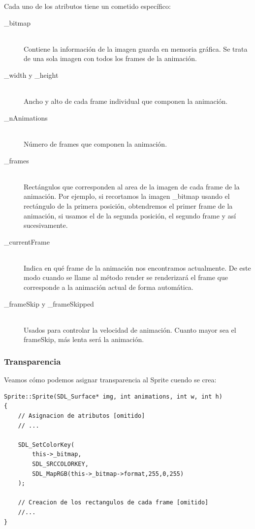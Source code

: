 \documentclass[parskip=half*]{scrartcl}
\begin{document}
		Cada uno de los atributos tiene un cometido espec\'ifico:

		\begin{description}
			\item[\_bitmap] \hfill \\	Contiene la informaci\'on de la imagen guarda en memoria gr\'afica. Se trata de una sola imagen con todos los frames de la animaci\'on.

			\item[\_width y \_height] \hfill \\	Ancho y alto de cada frame individual que componen la animaci\'on.

			\item[\_nAnimations] \hfill \\	N\'umero de frames que componen la animaci\'on.

			\item[\_frames] \hfill \\	Rect\'angulos que corresponden al area de la imagen de cada frame de la animaci\'on. Por ejemplo, si recortamos la imagen \_bitmap usando el rect\'angulo de la primera posici\'on, obtendremos el primer frame de la animaci\'on, si usamos el de la segunda posici\'on, el segundo frame y as\'i sucesivamente.

			\item[\_currentFrame] \hfill \\	Indica en qu\'e frame de la animaci\'on nos encontramos actualmente. De este modo cuando se llame al m\'etodo render se renderizar\'a el frame que corresponde a la animaci\'on actual de forma autom\'atica.

			\item[\_frameSkip y \_frameSkipped] \hfill \\	Usados para controlar la velocidad de animaci\'on. Cuanto mayor sea el frameSkip, m\'as lenta ser\'a la animaci\'on.
		\end{description}

		\subsubsection{Transparencia}
			Veamos c\'omo podemos asignar transparencia al Sprite cuendo se crea:

			\begin{verbatim}
Sprite::Sprite(SDL_Surface* img, int animations, int w, int h)
{
	// Asignacion de atributos [omitido]
	// ...

	SDL_SetColorKey(
		this->_bitmap,
		SDL_SRCCOLORKEY,
		SDL_MapRGB(this->_bitmap->format,255,0,255)
	);

	// Creacion de los rectangulos de cada frame [omitido]
	//...
}
			\end{verbatim}
\end{document}
